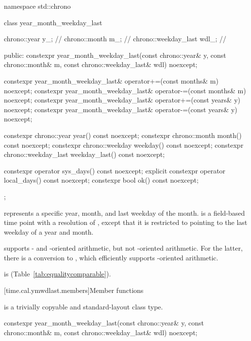 \begin{codeblock}
namespace std::chrono {
  class year_month_weekday_last {
    chrono::year         y_;    // \expos
    chrono::month        m_;    // \expos
    chrono::weekday_last wdl_;  // \expos

  public:
    constexpr year_month_weekday_last(const chrono::year& y, const chrono::month& m,
                                      const chrono::weekday_last& wdl) noexcept;

    constexpr year_month_weekday_last& operator+=(const months& m) noexcept;
    constexpr year_month_weekday_last& operator-=(const months& m) noexcept;
    constexpr year_month_weekday_last& operator+=(const years& y)  noexcept;
    constexpr year_month_weekday_last& operator-=(const years& y)  noexcept;

    constexpr chrono::year         year()         const noexcept;
    constexpr chrono::month        month()        const noexcept;
    constexpr chrono::weekday      weekday()      const noexcept;
    constexpr chrono::weekday_last weekday_last() const noexcept;

    constexpr          operator sys_days()   const noexcept;
    explicit constexpr operator local_days() const noexcept;
    constexpr bool ok() const noexcept;
  };
}
\end{codeblock}

\pnum
{} represents a specific year, month,
and last weekday of the month.
 is a field-based time point with a resolution of ,
except that it is restricted to pointing to the last weekday of a year and month.
\begin{note}
 supports - and -oriented arithmetic,
but not -oriented arithmetic.
For the latter, there is a conversion to ,
which efficiently supports -oriented arithmetic.
\end{note}
 is  (Table~\ref{tab:equalitycomparable}).

[time.cal.ymwdlast.members]{Member functions}

\pnum
{} is a trivially copyable and standard-layout class type.

%
\begin{itemdecl}
constexpr year_month_weekday_last(const chrono::year& y, const chrono::month& m,
                                  const chrono::weekday_last& wdl) noexcept;
\end{itemdecl}

